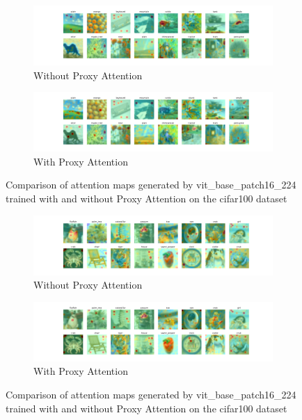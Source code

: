 \begin{figure}[!htb]
    \centering
    \begin{subfigure}[b]{1\textwidth}
        \includegraphics[width=\textwidth]{images/cifar100_vit_base_patch16_224_noproxy_2.pdf}
        \caption{Without Proxy Attention}
    \end{subfigure}
    \hfill
    \begin{subfigure}[b]{1\textwidth}
        \includegraphics[width=\textwidth]{images/cifar100_vit_base_patch16_224_proxy_2.pdf}
        \caption{With Proxy Attention}
    \end{subfigure}
    \caption{Comparison of attention maps generated by vit\_base\_patch16\_224 trained with and without Proxy Attention on the cifar100 dataset}
\end{figure}


\begin{figure}[!htb]
    \centering
    \begin{subfigure}[b]{1\textwidth}
        \includegraphics[width=\textwidth]{images/cifar100_vit_base_patch16_224_noproxy_3.pdf}
        \caption{Without Proxy Attention}
    \end{subfigure}
    \hfill
    \begin{subfigure}[b]{1\textwidth}
        \includegraphics[width=\textwidth]{images/cifar100_vit_base_patch16_224_proxy_3.pdf}
        \caption{With Proxy Attention}
    \end{subfigure}
    \caption{Comparison of attention maps generated by vit\_base\_patch16\_224 trained with and without Proxy Attention on the cifar100 dataset}
\end{figure}


